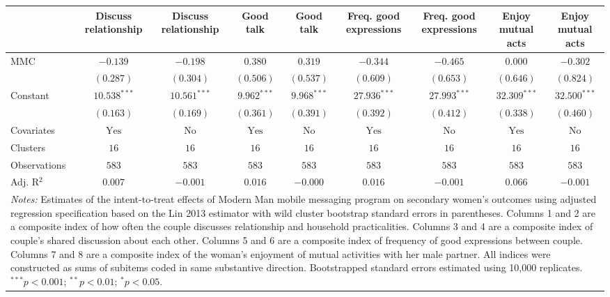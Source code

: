 
\begin{tabular}{l c c c c c c c c}
\toprule
 & Discuss relationship & Discuss relationship & Good talk & Good talk & Freq. good expressions & Freq. good expressions & Enjoy mutual acts & Enjoy mutual acts \\
\midrule
MMC          & $-0.139$       & $-0.198$       & $0.380$        & $0.319$       & $-0.344$       & $-0.465$       & $0.000$        & $-0.302$       \\
             & $(0.287)$      & $(0.304)$      & $(0.506)$      & $(0.537)$     & $(0.609)$      & $(0.653)$      & $(0.646)$      & $(0.824)$      \\
Constant     & $10.538^{***}$ & $10.561^{***}$ & $9.962^{***}$  & $9.968^{***}$ & $27.936^{***}$ & $27.993^{***}$ & $32.309^{***}$ & $32.500^{***}$ \\
             & $(0.163)$      & $(0.169)$      & $(0.361)$      & $(0.391)$     & $(0.392)$      & $(0.412)$      & $(0.338)$      & $(0.460)$      \\
\midrule
Covariates   & $\textrm{Yes}$ & $\textrm{No}$  & $\textrm{Yes}$ & $\textrm{No}$ & $\textrm{Yes}$ & $\textrm{No}$  & $\textrm{Yes}$ & $\textrm{No}$  \\
Clusters     & $16$           & $16$           & $16$           & $16$          & $16$           & $16$           & $16$           & $16$           \\
Observations & $583$          & $583$          & $583$          & $583$         & $583$          & $583$          & $583$          & $583$          \\
Adj. R$^2$   & $0.007$        & $-0.001$       & $0.016$        & $-0.000$      & $0.016$        & $-0.001$       & $0.066$        & $-0.001$       \\
\bottomrule
\multicolumn{9}{l}{\scriptsize{\parbox{\linewidth}{\vspace{2pt}
       \textit{Notes:} Estimates of the intent-to-treat effects of Modern Man mobile
       messaging program on secondary women's outcomes using adjusted regression
       specification based on the Lin 2013 estimator with wild cluster bootstrap
       standard errors in parentheses. Columns 1 and 2 are a composite index of
       how often the couple discusses relationship and household practicalities. 
       Columns 3 and 4 are a composite index of couple's shared discussion about each other.
       Columns 5 and 6 are a composite index of frequency of good expressions between couple.
       Columns 7 and 8 are a composite index of the woman's enjoyment of mutual activities with 
       her male partner. All indices were constructed as sums of subitems coded in
       same substantive direction. Bootstrapped standard errors estimated using 10,000 
       replicates. \\ $^{***}p<0.001$; $^{**}p<0.01$; $^{*}p<0.05$.}}}
\end{tabular}
